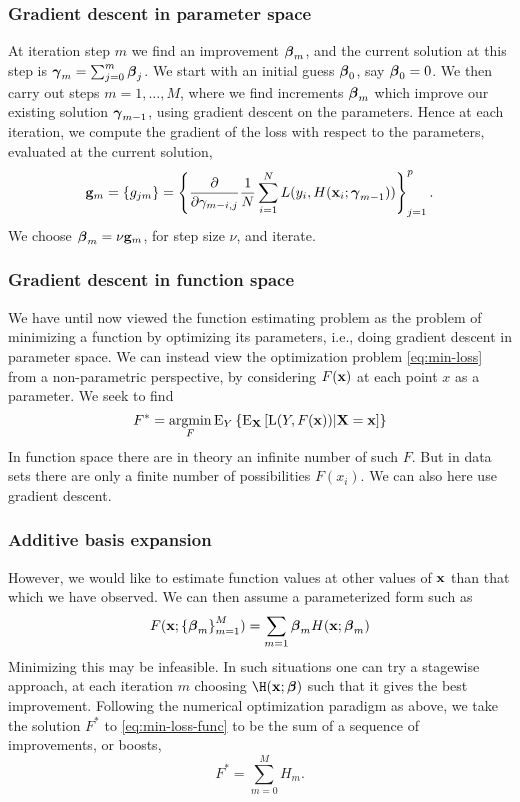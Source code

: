 \subsubsection{Gradient descent in parameter space}
At iteration step $m$ we find an improvement $\boldsymbol{\beta}_m$, and the current solution at this step is $\boldsymbol{\gamma}_m=\sum_{j=0}^m\boldsymbol{\beta}_j$. We start with an initial guess $\boldsymbol{\beta}_0$, say $\boldsymbol{\beta}_0=0$. We then carry out steps $m=1,\dotsc,M$, where we find increments $\boldsymbol{\beta}_m$ which improve our existing solution $\boldsymbol{\gamma}_{m-1}$, using gradient descent on the parameters. Hence at each iteration, we compute the gradient of the loss with respect to the parameters, evaluated at the current solution,
\begin{equation}
    \mathbf{g}_m=\{g_{jm}\}=\left\{\frac{\partial}{\partial\gamma_{m-i,j}}\frac{1}{N}\sum_{i=1}^NL(y_i,H(\mathbf{x}_i;\boldsymbol{\gamma}_{m-1}))\right\}_{j=1}^{p}.
\end{equation}
We choose $\boldsymbol{\beta}_m=\nu\mathbf{g}_m$, for step size $\nu$, and iterate.

\subsubsection*{Gradient descent in function space}
We have until now viewed the function estimating problem as the problem of minimizing a function by optimizing its parameters, i.e., doing gradient descent in parameter space. We can instead view the optimization problem \eqref{eq:min-loss} from a non-parametric perspective, by considering $F(\mathbf{x})$ at each point $x$ as a parameter. We seek to find
\begin{equation}\label{eq:min-loss-func}
    F^*=\operatorname*{argmin}_{F}\operatorname{E}_Y\left\{\operatorname{E}_{\mathbf{X}}\left[\operatorname{L}(Y,F(\mathbf{x}))|\mathbf{X}=\mathbf{x}\right]\right\}
\end{equation}
In function space there are in theory an infinite number of such $F$. But in data sets there are only a finite number of possibilities $F(x_i)$. We can also here use gradient descent.

\subsubsection{Additive basis expansion}
However, we would like to estimate function values at other values of $\mathbf{x}$ than that which we have observed. We can then assume a parameterized form such as
\begin{equation}
    F(\mathbf{x};\left\{\boldsymbol{\beta}_m\right\}_{m=1}^M)=\sum_{m=1}\boldsymbol{\beta}_mH(\mathbf{x};\boldsymbol{\beta}_m)
\end{equation}
Minimizing this may be infeasible. In such situations one can try a stagewise approach, at each iteration $m$ choosing $\H(\x;\bbeta)$ such that it gives the best improvement. 
Following the numerical optimization paradigm as above, we take the solution $F^*$ to \eqref{eq:min-loss-func} to be the sum of a sequence of improvements, or boosts,
\begin{equation}
    F^*=\sum_{m=0}^MH_m.
\end{equation}